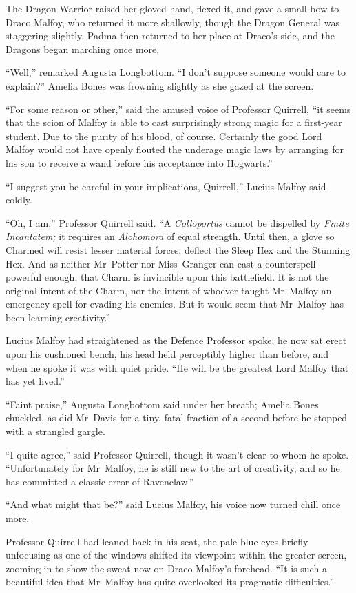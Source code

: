 The Dragon Warrior raised her gloved hand, flexed it, and gave a small bow to
Draco Malfoy, who returned it more shallowly, though the Dragon General was
staggering slightly. Padma then returned to her place at Draco’s side, and the
Dragons began marching once more.

“Well,” remarked Augusta Longbottom. “I don’t suppose someone would care to
explain?” Amelia Bones was frowning slightly as she gazed at the screen.

“For some reason or other,” said the amused voice of Professor Quirrell, “it
seems that the scion of Malfoy is able to cast surprisingly strong magic for a
first-year student. Due to the purity of his blood, of course. Certainly the
good Lord Malfoy would not have openly flouted the underage magic laws by
arranging for his son to receive a wand before his acceptance into Hogwarts.”

“I suggest you be careful in your implications, Quirrell,” Lucius Malfoy said
coldly.

“Oh, I am,” Professor Quirrell said. “A \emph{Colloportus} cannot be dispelled
by \emph{Finite Incantatem;} it requires an \emph{Alohomora} of equal strength.
Until then, a glove so Charmed will resist lesser material forces, deflect the
Sleep Hex and the Stunning Hex. And as neither Mr~Potter nor Miss~Granger can
cast a counterspell powerful enough, that Charm is invincible upon this
battlefield. It is not the original intent of the Charm, nor the intent of
whoever taught Mr~Malfoy an emergency spell for evading his enemies. But it
would seem that Mr~Malfoy has been learning creativity.”

Lucius Malfoy had straightened as the Defence Professor spoke; he now sat erect
upon his cushioned bench, his head held perceptibly higher than before, and
when he spoke it was with quiet pride. “He will be the greatest Lord Malfoy
that has yet lived.”

“Faint praise,” Augusta Longbottom said under her breath; Amelia Bones
chuckled, as did Mr~Davis for a tiny, fatal fraction of a second before he
stopped with a strangled gargle.

“I quite agree,” said Professor Quirrell, though it wasn’t clear to whom he
spoke. “Unfortunately for Mr~Malfoy, he is still new to the art of creativity,
and so he has committed a classic error of Ravenclaw.”

“And what might that be?” said Lucius Malfoy, his voice now turned chill once
more.

Professor Quirrell had leaned back in his seat, the pale blue eyes briefly
unfocusing as one of the windows shifted its viewpoint within the greater
screen, zooming in to show the sweat now on Draco Malfoy’s forehead. “It is
such a beautiful idea that Mr~Malfoy has quite overlooked its pragmatic
difficulties.”

